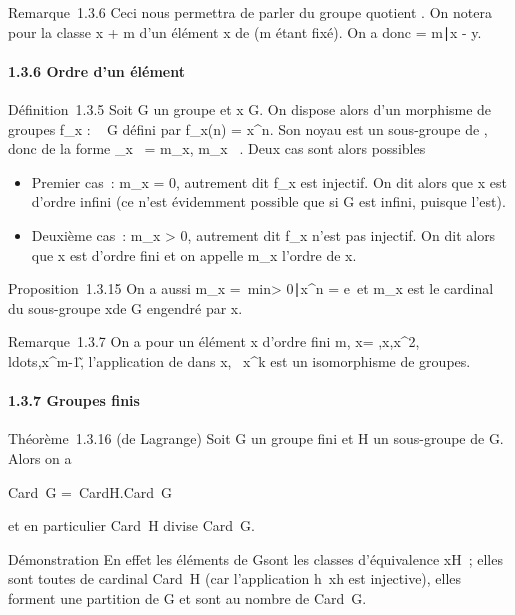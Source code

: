 Remarque~1.3.6 Ceci nous permettra de parler du groupe quotient \diagupm{}. On
notera \overlinex pour la classe x + m d'un élément
x de  (m étant fixé). On a donc \overlinex =
\overliney \Leftrightarrow
m∣x - y.

\paragraph{1.3.6 Ordre d'un élément}

Définition~1.3.5 Soit G un groupe et x \in G. On dispose alors d'un
morphisme de groupes f_x :  \rightarrow~ G défini par f_x(n) =
x^n. Son noyau est un sous-groupe de , donc de la forme
\mathrmKerf_x~ =
m_x, m_x \in {}~. Deux cas sont alors possibles

\begin{itemize}
\itemsep1pt\parskip0pt
\item
  Premier cas~: m_x = 0, autrement dit f_x est
  injectif. On dit alors que x est d'ordre infini (ce n'est évidemment
  possible que si G est infini, puisque  l'est).
\item
  Deuxième cas~: m_x > 0, autrement dit
  f_x n'est pas injectif. On dit alors que x est d'ordre fini
  et on appelle m_x l'ordre de x.
\end{itemize}

Proposition~1.3.15 On a aussi m_x =\
min\n >
0∣x^n = e\ et
m_x est le cardinal du sous-groupe \langle
x\rangle de G engendré par x.

Remarque~1.3.7 On a pour un élément x d'ordre fini m,
\langle x\rangle =
\e,x,x^2,\\ldots,x^m-1\~,
l'application de \diagupn{} dans \langle
x\rangle ,
\overlinek\mapsto~x^k
est un isomorphisme de groupes.

\paragraph{1.3.7 Groupes finis}

Théorème~1.3.16 (de Lagrange) Soit G un groupe fini et H un sous-groupe
de G. Alors on a

Card~G =\
CardH.Card~G\diagupH

et en particulier Card~H divise
Card~G.

Démonstration En effet les éléments de G\diagupH sont les classes
d'équivalence xH~; elles sont toutes de cardinal
Card~H (car l'application
h\mapsto~xh est injective), elles forment une
partition de G et sont au nombre de Card~G\diagupH.

